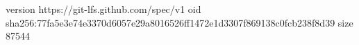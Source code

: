 version https://git-lfs.github.com/spec/v1
oid sha256:77fa5e3e74e3370d6057e29a8016526ff1472e1d3307f869138c0fcb238f8d39
size 87544
